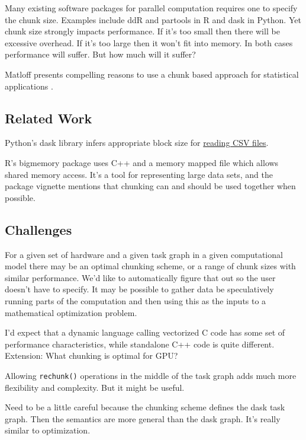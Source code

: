 \documentclass[12pt]{article}
\begin{document}
Many existing software packages for parallel computation requires one to specify the
chunk size. Examples include ddR \cite{R-ddR} and partools
\cite{R-partools} in R and dask in Python.
Yet chunk size strongly impacts
performance. If it's too small then there will be excessive overhead. If
it's too large then it won't fit into memory. In both cases performance
will suffer. But how much will it suffer?

Matloff presents compelling reasons to use a chunk based
approach for statistical applications \cite{matloff2014software}.

\subsection{Related Work}

Python's dask library infers appropriate block size for
\href{https://github.com/dask/dask/pull/1328}{reading CSV files}.

R's bigmemory package uses C++ and a memory mapped file which allows shared
memory access. \cite{kane2010bigmemory} It's a tool for representing large
data sets, and the package vignette mentions that chunking can and should
be used together when possible.

\subsection{Challenges}

For a given set of hardware and a given task graph in a given
computational model there may be
an optimal chunking scheme, or a range of chunk sizes with similar performance.
We'd like to automatically figure that out so the user doesn't have to
specify. It may be possible to gather data be speculatively running parts
of the computation and then using this as the inputs to a 
mathematical optimization problem.

I'd expect that a dynamic language calling vectorized C code has some set
of performance characteristics, while standalone C++ code is quite
different.
Extension: What chunking is optimal for GPU?

Allowing \texttt{rechunk()} operations in the middle of the task graph adds
much more flexibility and complexity. But it might be useful.

Need to be a little careful because the chunking scheme defines the dask
task graph. Then the semantics are more general than the dask graph. It's
really similar to optimization.
\end{document}
